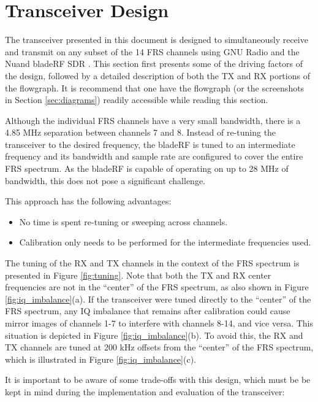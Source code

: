 \cleardoublepage

\section{Transceiver Design} \label{sec:design}

The transceiver presented in this document is designed to simultaneously receive
and transmit on any subset of the 14 \ac{FRS} channels using GNU Radio
\cite{GNURADIO} and the Nuand bladeRF \ac{SDR} \cite{BLADERF}.  This section
first presents some of the driving factors of the design,
followed by a detailed description of both the \ac{TX} and \ac{RX} portions
of the flowgraph. It is recommend that one have the flowgraph (or the
screenshots in Section \ref{sec:diagrams})  readily accessible while reading
this section.

Although the individual \ac{FRS} channels have a very small bandwidth, there is
a 4.85 MHz separation between channels 7 and 8. Instead of re-tuning the
transceiver to the desired frequency, the bladeRF is tuned to an intermediate
frequency and its bandwidth and sample rate are configured to cover the entire
\ac{FRS} spectrum. As the bladeRF is capable of operating on up to 28 MHz of
bandwidth, this does not pose a significant challenge.

This approach has the following advantages:
\begin{itemize}
  \item No time is spent re-tuning or sweeping across channels.
  \item Calibration only needs to be performed for the intermediate
        frequencies used.
\end{itemize}

The tuning of the \ac{RX} and \ac{TX} channels in the context of the
\ac{FRS} spectrum is presented in Figure \ref{fig:tuning}.  Note that both
the \ac{TX} and \ac{RX} center frequencies are not in the ``center'' of the
\ac{FRS} spectrum, as also shown in Figure \ref{fig:iq_imbalance}(a).
If the transceiver were tuned directly to the ``center'' of the \ac{FRS}
spectrum, any IQ imbalance that remains after calibration could cause mirror
images of channels 1-7 to interfere with channels 8-14, and vice versa. This situation
is depicted in Figure \ref{fig:iq_imbalance}(b). To avoid this, the \ac{RX} and
\ac{TX} channels are tuned at 200 kHz offsets from the ``center'' of the
\ac{FRS} spectrum, which is illustrated in Figure \ref{fig:iq_imbalance}(c).

It is important to be aware of some trade-offs with this design, which must be
be kept in mind during the implementation and evaluation of the transceiver:

